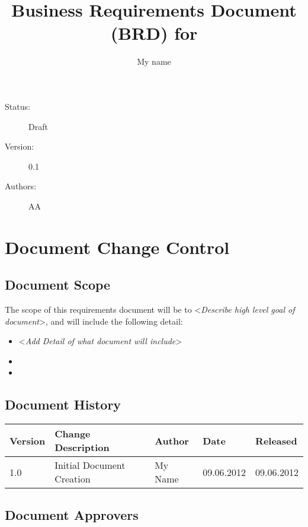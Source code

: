 \documentclass[english,12pt]{scrartcl}
\title{Business Requirements Document (BRD) for \project}
\author{My name}
\newcommand{\comment}[1]{\textless\textit{#1}\textgreater\vspace*{1ex}}
\begin{document}
\maketitle
 
\vfill
 
{\large
\begin{description}
\item [Status:] Draft 
\item [Version:] 0.1
\item [Authors:] AA
\end{description}}
 
\clearpage
 
\tableofcontents
\clearpage

\section{Document Change Control}
 
\subsection{Document Scope}
 
The scope of this requirements document will be to \comment{Describe high level goal of document}, and will include the following detail:
 
\begin{itemize}
\item \comment{Add Detail of what document will include}
\item 
\item 
\end{itemize}
 
\subsection{Document History}
 
\begin{tabular}{p{}p{}p{}p{}p{}    }\toprule
Version	& Change Description	&Author	&Date & Released \\ \midrule
1.0 & 	Initial Document Creation	& My Name & 09.06.2012 & 09.06.2012 \\ \bottomrule
\end{tabular}
 
\subsection{Document Approvers}
 
\end{document}
